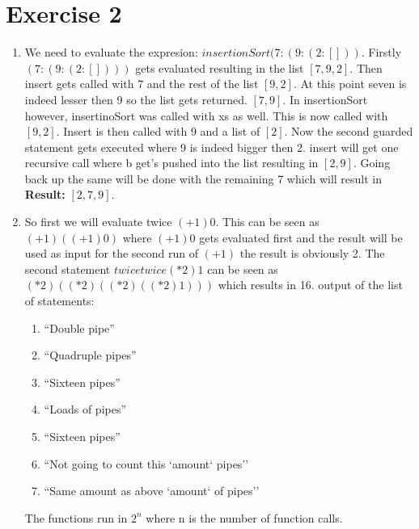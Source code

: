 \documentclass{article}
\begin{document}
\section*{Exercise 2}
\begin{enumerate}
  \item We need to evaluate the expresion: $insertionSort (7 : (9 : (2 : [ ]))$.
  Firstly $(7: (9: (2: [ ])))$ gets evaluated resulting in the list $[7,9,2]$. Then insert gets called with 7 and the rest of the list $[9,2]$. At this point seven is indeed lesser then 9 so the list gets returned. $[7,9]$. In insertionSort however, insertinoSort was called with xs as well. This is now called with $[9,2]$. Insert is then called with 9 and a list of $[2]$. Now the second guarded statement gets executed where 9 is indeed bigger then 2. insert will get one recursive call where b get's pushed into the list resulting in $[2,9]$. Going back up the same will be done with the remaining 7 which will result in \textbf{Result:} $[2,7,9]$.
  \item So first we will evaluate twice $(+1) 0$. This can be seen as $(+1) ((+1) 0)$ where $(+1) 0$ gets evaluated first and the result will be used as input for the second run of $(+1)$ the result is obviously 2.
  The second statement $twice twice (*2) 1$ can be seen as $(*2) ((*2) ((*2) ((*2) 1)))$ which results in 16.
  output of the list of statements:
  \begin{enumerate}
    \item ``Double pipe''
    \item ``Quadruple pipes''
    \item ``Sixteen pipes''
    \item ``Loads of pipes''
    \item ``Sixteen pipes''
    \item ``Not going to count this `amount` pipes''
    \item ``Same amount as above `amount` of pipes''
  \end{enumerate}
  The functions run in $2^n$ where n is the number of function calls.
\end{enumerate}
\end{document}
